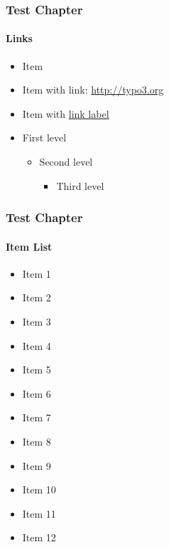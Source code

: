 \begin{frame}
	\frametitle{Test Chapter}
	\framesubtitle{Links}

	\begin{itemize}
		\item Item
		\item Item with link: \url{http://typo3.org}
		\item Item with \href{http://typo3.org}{link label}

		\item First level
		\begin{itemize}
			\item Second level
			\begin{itemize}
				\item Third level
			\end{itemize}
		\end{itemize}

	\end{itemize}

\end{frame}


\begin{frame}
	\frametitle{Test Chapter}
	\framesubtitle{Item List}

	\begin{itemize}
		\item Item 1
		\item Item 2
		\item Item 3
		\item Item 4
		\item Item 5
		\item Item 6
		\item Item 7
		\item Item 8
		\item Item 9
		\item Item 10
		\item Item 11
		\item Item 12
	\end{itemize}

\end{frame}


